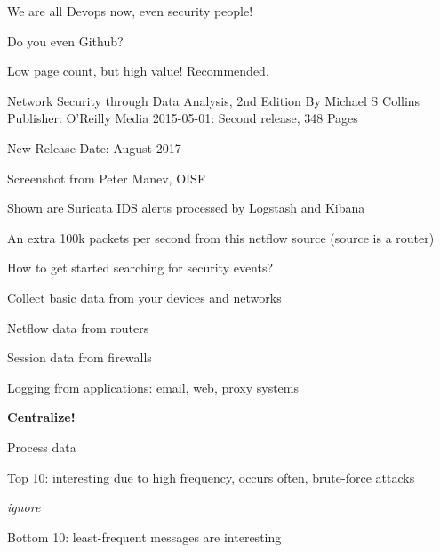 \documentclass[20pt,landscape,a4paper,footrule]{foils}
\begin{document}
\centerline{We are all Devops now, even security people!}

Do you even Github? \smiley {}



Low page count, but high value! Recommended.

Network Security through Data Analysis, 2nd Edition
By Michael S Collins
Publisher: O'Reilly Media
2015-05-01: Second release, 348 Pages

New Release Date: August 2017



\vskip 2cm
\begin{list2}
\item Screenshot from Peter Manev, OISF
\item Shown are Suricata IDS alerts processed by Logstash and Kibana
\end{list2}









\centerline{An extra 100k packets per second from this netflow source (source is a router)}



\begin{list1}
\item How to get started searching for security events?
\item Collect basic data from your devices and networks
\begin{list2}
\item Netflow data from routers
\item Session data from firewalls
\item Logging from applications: email, web, proxy systems
\end{list2}
\item {\bf Centralize!}
\item Process data
\begin{list2}
\item Top 10: interesting due to high frequency, occurs often, brute-force attacks
\item {\it ignore}
\item Bottom 10: least-frequent messages are interesting
\end{list2}
\end{list1}
\end{document}
